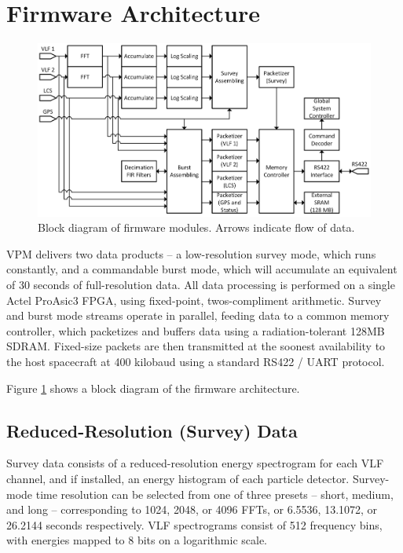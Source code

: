 \section{Firmware Architecture}
\begin{figure}[t]
\begin{center}
\includegraphics[width=35pc]{figures/vpm_figures/firmware_diagram_v2.png}

\caption[Block diagram of VPM firmware modules]{Block diagram of firmware modules. Arrows indicate flow of data.}
\label{fig:firmware_arch}
\end{center}
\end{figure}
VPM delivers two data products -- a low-resolution survey mode, which runs constantly, and a commandable burst mode, which will accumulate an equivalent of 30 seconds of full-resolution data. All data processing is performed on a single Actel ProAsic3 FPGA, using fixed-point, twos-compliment arithmetic. Survey and burst mode streams operate in parallel, feeding data to a common memory controller, which packetizes and buffers data using a radiation-tolerant 128MB SDRAM. Fixed-size packets are then transmitted at the soonest availability to the host spacecraft at 400 kilobaud using a standard RS422 / UART protocol.

Figure \ref{fig:firmware_arch} shows a block diagram of the firmware architecture.


\subsection{Reduced-Resolution (Survey) Data}
Survey data consists of a reduced-resolution energy spectrogram for each VLF channel, and if installed, an energy histogram of each particle detector. Survey-mode time resolution can be selected from one of three presets -- short, medium, and long -- corresponding to 1024, 2048, or 4096 FFTs, or 6.5536, 13.1072, or 26.2144 seconds respectively. VLF spectrograms consist of 512 frequency bins, with energies mapped to 8 bits on a logarithmic scale.


